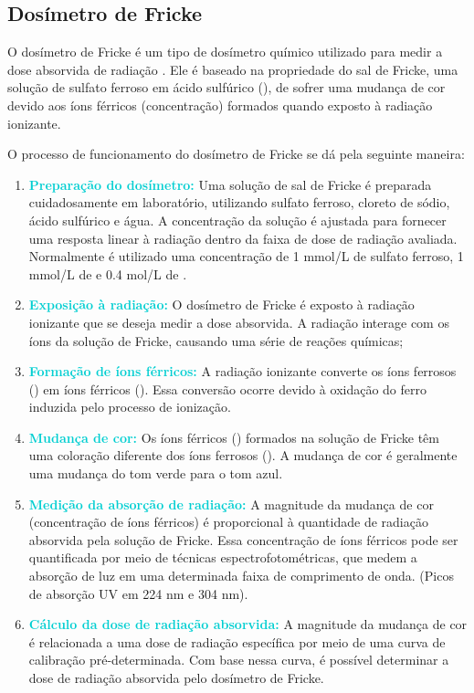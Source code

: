 \documentclass[11pt,a4paper]{article}
\begin{document}
\subsection*{Dosímetro de Fricke}

		O dosímetro de Fricke é um tipo de dosímetro químico utilizado para medir a dose absorvida de radiação . Ele é baseado na propriedade do sal de Fricke, uma solução de sulfato ferroso  em ácido sulfúrico (), de sofrer uma mudança de cor devido aos íons férricos (concentração) formados quando exposto à radiação ionizante.

		O processo de funcionamento do dosímetro de Fricke se dá pela seguinte maneira:

		\begin{enumerate}
			\item \textcolor{DarkTurquoise}{\textbf{Preparação do dosímetro:}} Uma solução de sal de Fricke é preparada cuidadosamente em laboratório, utilizando sulfato ferroso, cloreto de sódio, ácido sulfúrico e água. A concentração da solução é ajustada para fornecer uma resposta linear à radiação dentro da faixa de dose de radiação avaliada. Normalmente é utilizado uma concentração de 1 mmol/L de sulfato ferroso, 1 mmol/L de  e 0.4 mol/L de .
			\item \textcolor{DarkTurquoise}{\textbf{Exposição à radiação:}} O dosímetro de Fricke é exposto à radiação ionizante que se deseja medir a dose absorvida. A radiação interage com os íons da solução de Fricke, causando uma série de reações químicas;
			\item \textcolor{DarkTurquoise}{\textbf{Formação de íons férricos:}} A radiação ionizante converte os íons ferrosos () em íons férricos (). Essa conversão ocorre devido à oxidação do ferro induzida pelo processo de ionização.
			\item \textcolor{DarkTurquoise}{\textbf{Mudança de cor:}} Os íons férricos () formados na solução de Fricke têm uma coloração diferente dos íons ferrosos (). A mudança de cor é geralmente uma mudança do tom verde para o tom azul.
			\item \textcolor{DarkTurquoise}{\textbf{Medição da absorção de radiação:}} A magnitude da mudança de cor (concentração de íons férricos) é proporcional à quantidade de radiação absorvida pela solução de Fricke. Essa concentração de íons férricos pode ser quantificada por meio de técnicas espectrofotométricas, que medem a absorção de luz em uma determinada faixa de comprimento de onda. (Picos de absorção UV em 224 nm e 304 nm).
			\item \textcolor{DarkTurquoise}{\textbf{Cálculo da dose de radiação absorvida:}} A magnitude da mudança de cor é relacionada a uma dose de radiação específica por meio de uma curva de calibração pré-determinada. Com base nessa curva, é possível determinar a dose de radiação absorvida pelo dosímetro de Fricke.
		\end{enumerate}
\end{document}
